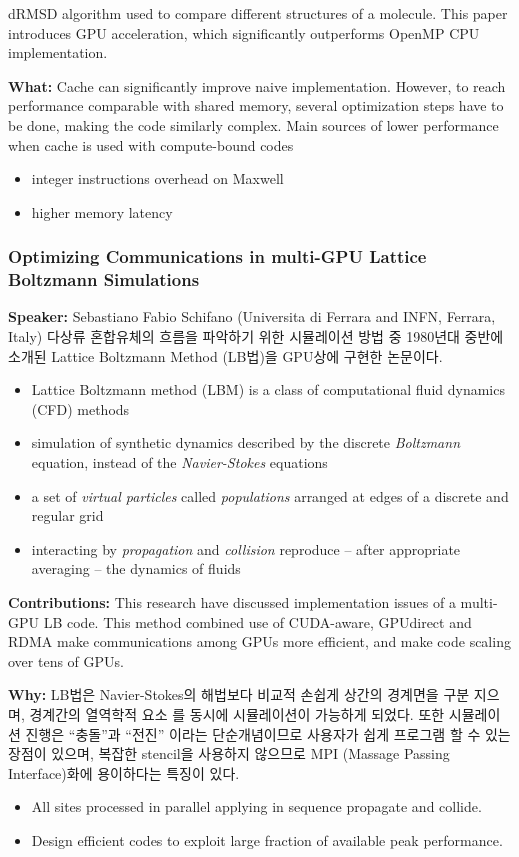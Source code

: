 \documentclass[twocolumn]{article}
\newcommand{\bi}{\begin{itemize}}
\newcommand{\ei}{\end{itemize}}
\newcommand{\ii}{\item}
\begin{document}
dRMSD algorithm used to compare different structures of a molecule. 
This paper introduces GPU acceleration, which significantly outperforms OpenMP CPU implementation.

\noindent
\textbf{What:}  
Cache can significantly improve naive implementation.
However, to reach performance comparable with shared memory, several optimization steps have to be done, making the code similarly complex.
Main sources of lower performance when cache is used with compute-bound codes
\bi
\ii integer instructions overhead on Maxwell 
\ii higher memory latency
\ei

\subsubsection{Optimizing Communications in multi-GPU Lattice Boltzmann Simulations}
\textbf{Speaker:} Sebastiano Fabio Schifano (Universita di Ferrara and INFN, Ferrara, Italy)
다상류 혼합유체의 흐름을 파악하기 위한 시뮬레이션 방법 중 1980년대 중반에 소개된 Lattice Boltzmann Method (LB법)을 GPU상에 구현한 논문이다.

\bi
\ii Lattice Boltzmann method (LBM) is a class of computational fluid dynamics (CFD) methods
\ii  simulation of synthetic dynamics described by the discrete \textit{Boltzmann} equation, instead of the \textit{Navier-Stokes} equations
\ii a set of \textit{virtual particles} called \textit{populations} arranged at edges of a discrete and regular grid
\ii  interacting by \textit{propagation} and \textit{collision} reproduce – after appropriate averaging – the dynamics of fluids
\ei
\noindent
\textbf{Contributions:}  
This research have discussed implementation issues of a multi-GPU LB code. This method combined use of CUDA-aware, GPUdirect and RDMA make communications among GPUs more efficient, and make code scaling over tens of GPUs.

\noindent
\textbf{Why:}  
LB법은 Navier-Stokes의 해법보다 비교적 손쉽게 상간의 경계면을 구분 지으며, 경계간의 열역학적 요소 를 동시에 시뮬레이션이 가능하게 되었다.
또한 시뮬레이션 진행은 “충돌”과 “전진” 이라는 단순개념이므로 사용자가 쉽게 프로그램 할 수 있는 장점이 있으며, 
복잡한 stencil을 사용하지 않으므로 MPI (Massage Passing Interface)화에 용이하다는 특징이 있다.
\bi
\ii All sites processed in parallel applying in sequence propagate and collide.
\ii Design efficient codes to exploit large fraction of available peak performance.
\ei
\end{document}
